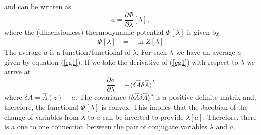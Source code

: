 \documentclass[b5paper,openright,10pt]{book}
\newcommand{\Tirar}[1]{{\color{Magenta}#1}}   %
\begin{document}
and can be written as 
\begin{equation}
a =\frac{\partial \Phi}{\partial
\lambda}[\lambda],
\label{cg1}
\end{equation}
where the  (dimensionless) thermodynamic potential  $\Phi[\lambda]$ is
given by
\begin{align}
  \Phi[\lambda]&=-\ln Z[\lambda]
    \label{PhiLambda}
\end{align}
The average $a$  is a function/functional of  $\lambda$. For each
$\lambda$ we  have an average  $a$ given  by equation (\ref{cg1}).   If we
take the derivative of (\ref{cg1}) with respect to $\lambda$ we arrive
at
\begin{equation}
\frac{\partial a }{\partial \lambda}= -\langle \delta \hat{A}\delta
\hat{A}\rangle^\lambda
\label{covariances}
\end{equation}
where $\delta  A =  \hat{A}(z)-a$.  The  covariance $\langle  \delta \hat{A}\delta
\hat{A}\rangle^{\lambda}$ is a positive definite matrix and, therefore, the functional
$\Phi[\lambda]$  is convex.  This  implies that  the  Jacobian of  the
change of variables  from $\lambda$ to $a$ can be  inverted to provide
$\lambda[a]$.   Therefore, there  is  a  one to  one  connection
between the  pair of conjugate  variables $\lambda$ and  $a$.


\end{document}
